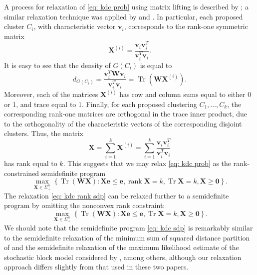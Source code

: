 \documentclass[twoside,11pt]{article}
\DeclareMathOperator{\rank}{{rank}}
\DeclareMathOperator{\tr}{{Tr}}
\newcommand{\e}{\bs {e}}
\newcommand{\bs}{\boldsymbol}
\renewcommand{\v}{\bs{v}}
\newcommand{\X}{\bs {X}}
\newcommand{\W}{\bs {W}}
\newcommand{\0}{\bs{0}}
\newcommand{\bra}[1]{\ensuremath{\left\{ #1 \right\}}} %
\begin{document}
{	%
	 A process for relaxation of \eqref{eq: kdc prob} using matrix lifting is described by \cite{ames2014guaranteed};
	a similar relaxation technique was applied by
	\cite{ames2011nuclear, ames2014convex}
	and \cite{ames2015guaranteed}.
	In particular, each proposed cluster \(C_i\), with characteristic vector \(\v_i\), corresponds to the rank-one symmetric matrix
	\[
	\X^{(i)} =  \frac{ \v_i \v_i^T}{ \v_i^T \v_i}.
	\]
	It is easy to see that the density of \(G(C_i)\) is equal to
	\[
	d_{G(C_i)}= \frac{ \v_i^T \W \v_i }{\v_i^T \v_i }  = \tr( \W \X^{(i)}) .
	\]
	Moreover, each of the matrices \(\X^{(i)}\) has row and column sums equal to either 0 or 1, and trace equal to 1.
	Finally,
	for each proposed clustering \(C_1, \dots, C_k\), the corresponding rank-one matrices are orthogonal in the trace inner
	product, due to the orthogonality of the characteristic vectors of the corresponding disjoint clusters.
	Thus, the matrix
	\begin{equation} \label{eq: cluster X}
	\X = \sum_{i=1}^k \X^{(i)} = \sum_{i=1}^k \frac{ \v_i \v_i^T}{ \v_i^T \v_i}
	\end{equation}
	has rank equal to \(k\).
	This suggests that we may relax \eqref{eq: kdc prob} as the rank-constrained semidefinite program
	\begin{equation} \label{eq: kdc rank sdp}
	\max_{\X \in \Sigma^n_+} \bra{ \tr(\W\X): \X \e \le \e, \rank \X = k, \tr \X = k, \X \ge \0 }.
	\end{equation}
	The relaxation \eqref{eq: kdc rank sdp} can be relaxed further to a semidefinite program
	by omitting the nonconvex rank constraint:
	\begin{equation} \label{eq: kdc sdp}
	\max_{\X \in \Sigma^n_+} \bra{ \tr(\W\X): \X \e \le \e, \tr \X = k, \X \ge \0}.
	\end{equation}
	We should note that the semidefinite program \eqref{eq: kdc sdp} is remarkably similar to the
	semidefinite relaxation of the minimum sum of squared distance partition of \cite{peng2007approximating}
	and the semidefinite relaxation of the maximum likelihood estimate of
	the stochastic block model considered by \cite{amini2014semidefinite}, among others,
	although our relaxation approach differs slightly from that used in these two papers.

}
\end{document}
